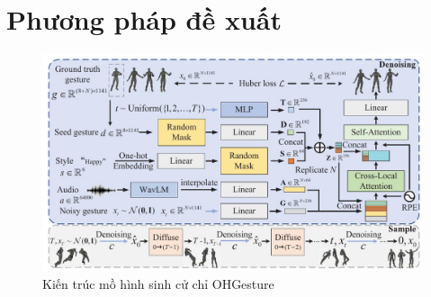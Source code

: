 %   

\chapter{Phương pháp đề xuất}
\label{Chapter3}

\begin{figure}
    \centering
    \includegraphics[width=\linewidth]{images/architecture.jpg}
    \caption{Kiến trúc mồ hình sinh cử chỉ OHGesture}
    \label{fig:architecture}
\end{figure}



